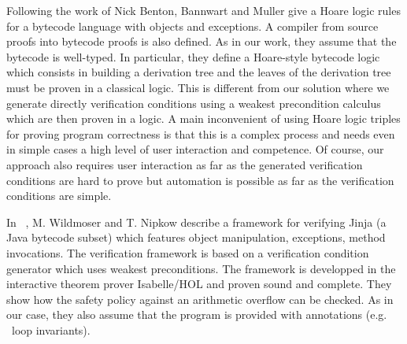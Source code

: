 Following the work of Nick Benton, Bannwart and Muller \cite{BannwartMueller05} give  a Hoare logic rules
for a bytecode language with objects and  exceptions. A compiler from source proofs into bytecode proofs is also defined. 
As in our work, they assume that the bytecode is well-typed. 
In particular, they define a Hoare-style bytecode logic which consists in building a derivation tree 
and the leaves of the derivation tree must be proven in a classical logic. This is different from our solution
where we generate directly  verification conditions using a weakest precondition calculus which are then proven in a logic.
 A main inconvenient of using  Hoare logic triples for proving program correctness is that this is  
  a complex process and needs even in simple cases a high level of user interaction and competence. Of course, our approach
 also requires user interaction as far as the generated verification conditions are hard to prove but automation 
 is possible as far as the verification conditions are simple.
  
 In ~\cite{WildmoserN-ESOP05}, M. Wildmoser and T. Nipkow describe a framework for verifying Jinja (a Java   bytecode subset) which features
 object manipulation, exceptions, method invocations. The verification framework is   based on a verification condition generator which uses
 weakest preconditions. The  framework is developped  in the interactive theorem prover Isabelle/HOL and proven sound and complete. 
 They show how the safety policy against an arithmetic overflow can be checked. As in our case, they also assume that the program is provided
with annotations (e.g. \ loop invariants). 


